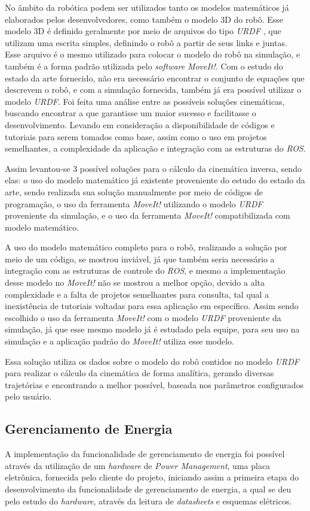No âmbito da robótica podem ser utilizados tanto os modelos matemáticos já elaborados pelos desenvolvedores, como também o modelo 3D do robô. Esse modelo 3D é definido geralmente por meio de arquivos do tipo \textit{URDF} , que utilizam uma escrita simples, definindo o robô a partir de seus links e juntas. Esse arquivo é o mesmo utilizado para colocar o modelo do robô na simulação, e também é a forma padrão utilizada pelo \textit{software} \textit{MoveIt!}.
Com o estudo do estado da arte fornecido, não era necessário encontrar o conjunto de equações que descrevem o robô, e com a simulação fornecida, também já era possível utilizar o modelo \textit{URDF}. Foi feita uma análise entre as possíveis soluções cinemáticas, buscando encontrar a que garantisse um maior sucesso e facilitasse o desenvolvimento. Levando em consideração a disponibilidade de códigos e tutoriais para serem tomados como base, assim como o uso em projetos semelhantes, a complexidade da aplicação e integração com as estruturas do \textit{ROS}.

Assim levantou-se 3 possível soluções para o cálculo da cinemática inversa, sendo elas: o uso do modelo matemático já existente proveniente do estudo do estado da arte, sendo realizada sua solução manualmente por meio de códigos de programação, o uso da ferramenta \textit{MoveIt!} utilizando o modelo \textit{URDF} proveniente da simulação, e o uso da ferramenta \textit{MoveIt!} compatibilizada com modelo matemático.

A uso do modelo matemático completo para o robô, realizando a  solução por meio de um código, se mostrou inviável, já que também seria necessário a integração com as estruturas de controle do \textit{ROS}, e mesmo a implementação desse modelo no \textit{MoveIt!} não se mostrou a melhor opção, devido a alta complexidade e a falta de projetos semelhantes para consulta, tal qual a inexistência de tutoriais voltadas para essa aplicação em específico. Assim sendo escolhido o uso da ferramenta \textit{MoveIt!} com o modelo \textit{URDF} proveniente da simulação, já que esse mesmo modelo já é estudado pela equipe, para seu uso na simulação e a aplicação padrão do \textit{MoveIt!} utiliza esse modelo.

Essa solução utiliza os dados sobre o modelo do robô contidos no modelo \textit{URDF} para realizar o cálculo da cinemática de forma analítica, gerando diversas trajetórias e encontrando a melhor possível, baseada nos parâmetros configurados pelo usuário.

\subsection{Gerenciamento de Energia}\label{sec:geren_ene}
A implementação da funcionalidade de gerenciamento de energia foi possível através da utilização de um \textit{hardware} de \textit{Power Management}, uma placa eletrônica, fornecida pelo cliente do projeto, iniciando assim a primeira etapa do desenvolvimento da funcionalidade de gerenciamento de energia, a qual se deu pelo estudo do \textit{hardware}, através da leitura de \textit{datasheets} e esquemas elétricos. 

